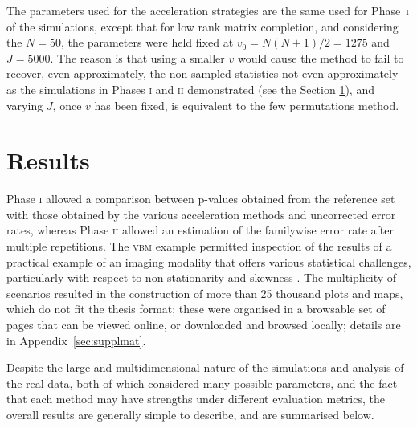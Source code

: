 The parameters used for the acceleration strategies are the same used for Phase~\textsc{i} of the simulations, except that for low rank matrix completion, and considering the $N=50$, the parameters were held fixed at $v_0=N(N+1)/2=1275$ and $J=5000$. The reason is that using a smaller $v$ would cause the method to fail to recover, even approximately, the non-sampled statistics not even approximately as the simulations in Phases \textsc{i} and \textsc{ii} demonstrated (see the Section \ref{sec:accel:results}), and varying $J$, once $v$ has been fixed, is equivalent to the few permutations method.

\section{Results}
\label{sec:accel:results}

Phase \textsc{i} allowed a comparison between p-values obtained from the reference set with those obtained by the various acceleration methods and uncorrected error rates, whereas Phase \textsc{ii} allowed an estimation of the familywise error rate after multiple repetitions. The \textsc{vbm} example permitted inspection of the results of a practical example of an imaging modality that offers various statistical challenges, particularly with respect to non-stationarity \citep{Hayasaka2004, Salimi-Khorshidi2011} and skewness \citep{Salmond2002, Viviani2007}. The multiplicity of scenarios resulted in the construction of more than 25 thousand plots and maps, which do not fit the thesis format; these were organised in a browsable set of pages that can be viewed online, or downloaded and browsed locally; details are in Appendix~\ref{sec:supplmat}.

Despite the large and multidimensional nature of the simulations and analysis of the real data, both of which considered many possible parameters, and the fact that each method may have strengths under different evaluation metrics, the overall results are generally simple to describe, and are summarised below.


